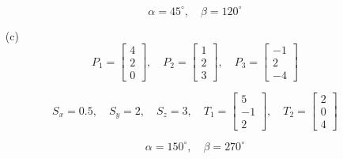 \begin{enumerate}
    \[
    \alpha = 45^\circ, \quad \beta = 120^\circ
    \]

    \item[(c)] 
    \[
    P_1 = \begin{bmatrix} 4 \\ 2 \\ 0 \end{bmatrix}, 
    \quad P_2 = \begin{bmatrix} 1 \\ 2 \\ 3 \end{bmatrix}, 
    \quad P_3 = \begin{bmatrix} -1 \\ 2 \\ -4 \end{bmatrix}
    \]

    \[
    S_x = 0.5, \quad S_y = 2, \quad S_z = 3, 
    \quad T_1 = \begin{bmatrix} 5 \\ -1 \\ 2 \end{bmatrix}, 
    \quad T_2 = \begin{bmatrix} 2 \\ 0 \\ 4 \end{bmatrix}
    \]

    \[
    \alpha = 150^\circ, \quad \beta = 270^\circ
    \]
\end{enumerate}

